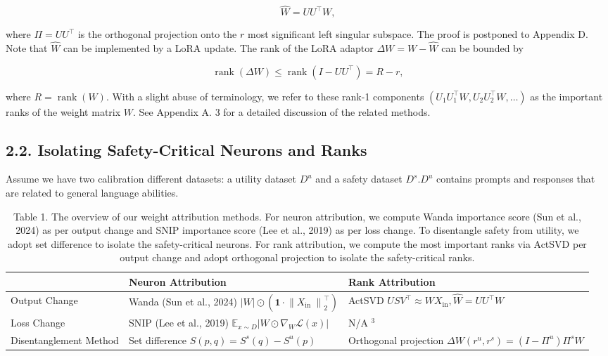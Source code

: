\documentclass[10pt]{article}
\begin{document}
$$
\widehat{W}=U U^{\top} W,
$$

where $\Pi=U U^{\top}$ is the orthogonal projection onto the $r$ most significant left singular subspace. The proof is postponed to Appendix D. Note that $\widehat{W}$ can be implemented by a LoRA update. The rank of the LoRA adaptor $\Delta W=W-\widehat{W}$ can be bounded by

$$
\operatorname{rank}(\Delta W) \leq \operatorname{rank}\left(I-U U^{\top}\right)=R-r,
$$

where $R=\operatorname{rank}(W)$. With a slight abuse of terminology, we refer to these rank-1 components $\left(U_{1} U_{1}^{\top} W, U_{2} U_{2}^{\top} W, \ldots\right)$ as the important ranks of the weight matrix $W$. See Appendix A. 3 for a detailed discussion of the related methods.

\subsection*{2.2. Isolating Safety-Critical Neurons and Ranks}
Assume we have two calibration different datasets: a utility dataset $D^{u}$ and a safety dataset $D^{s} . D^{u}$ contains prompts and responses that are related to general language abilities.

\begin{table}[h]
\begin{center}
\begin{tabular}{|l|l|l|}
\hline
 & Neuron Attribution & Rank Attribution \\
\hline
Output Change & Wanda (Sun et al., 2024) \( |W| \odot\left(\mathbf{1} \cdot\left\|X_{\text {in }}\right\|_{2}^{\top}\right) \) & ActSVD \( U S V^{\top} \approx W X_{\mathrm{in}}, \widehat{W}=U U^{\top} W \) \\
\hline
Loss Change & SNIP (Lee et al., 2019) \( \mathbb{E}_{x \sim D}\left|W \odot \nabla_{W} \mathcal{L}(x)\right| \) & N/A ${ }^{3}$ \\
\hline
Disentanglement Method & Set difference \( S(p, q)=S^{s}(q)-S^{u}(p) \) & Orthogonal projection \( \Delta W\left(r^{u}, r^{s}\right)=\left(I-\Pi^{u}\right) \Pi^{s} W \) \\
\hline
\end{tabular}
\captionsetup{labelformat=empty}
\caption{Table 1. The overview of our weight attribution methods. For neuron attribution, we compute Wanda importance score (Sun et al., 2024) as per output change and SNIP importance score (Lee et al., 2019) as per loss change. To disentangle safety from utility, we adopt set difference to isolate the safety-critical neurons. For rank attribution, we compute the most important ranks via ActSVD per output change and adopt orthogonal projection to isolate the safety-critical ranks.}
\end{center}
\end{table}
\end{document}
